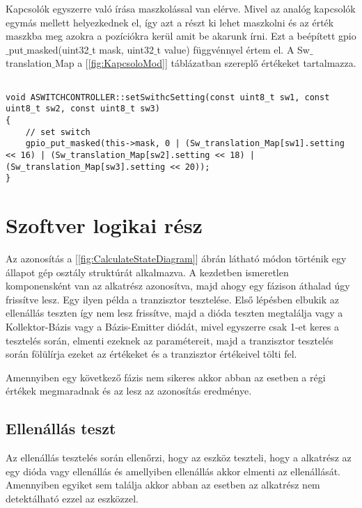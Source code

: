 Kapcsolók egyszerre való írása maszkolással van elérve. Mivel az 
analóg kapcsolók egymás mellett helyezkednek el, így azt a 
részt ki lehet maszkolni és az érték maszkba meg azokra a pozíciókra
kerül amit be akarunk írni. Ezt a beépített gpio$\_$put$\_$masked(uint32$\_$t mask, uint32$\_$t value)
függvénnyel értem el. A Sw$\_$translation$\_$Map a [\ref{fig:KapcsoloMod}] táblázatban
szereplő értékeket tartalmazza.


\begin{lstlisting}

void ASWITCHCONTROLLER::setSwithcSetting(const uint8_t sw1, const uint8_t sw2, const uint8_t sw3)
{
    // set switch
    gpio_put_masked(this->mask, 0 | (Sw_translation_Map[sw1].setting << 16) | (Sw_translation_Map[sw2].setting << 18) | (Sw_translation_Map[sw3].setting << 20));
}

\end{lstlisting}


\section{Szoftver logikai rész}

Az azonosítás a [\ref{fig:CalculateStateDiagram}] ábrán látható
módon történik egy állapot gép osztály struktúrát alkalmazva.
A kezdetben ismeretlen komponensként van az alkatrész azonosítva,
majd ahogy egy fázison áthalad úgy frissítve lesz. 
Egy ilyen példa a tranzisztor tesztelése. Első lépésben elbukik az 
ellenállás teszten így nem lesz frissítve, majd a dióda teszten
megtalálja vagy a Kollektor-Bázis vagy a Bázis-Emitter diódát, 
mivel egyszerre csak 1-et keres a tesztelés során, elmenti ezeknek az 
paramétereit, majd a tranzisztor tesztelés során fölülírja ezeket az értékeket 
és a tranzisztor értékeivel tölti fel.

Amennyiben egy következő fázis nem sikeres akkor abban az esetben 
a régi értékek megmaradnak és az lesz az azonosítás eredménye.

\subsection{Ellenállás teszt}

Az ellenállás tesztelés során ellenőrzi, hogy az eszköz teszteli, 
hogy a alkatrész az egy dióda vagy ellenállás és amellyiben ellenállás 
akkor elmenti az ellenállását. Amennyiben egyiket sem találja
akkor abban az esetben az alkatrész nem detektálható ezzel az eszközzel.


